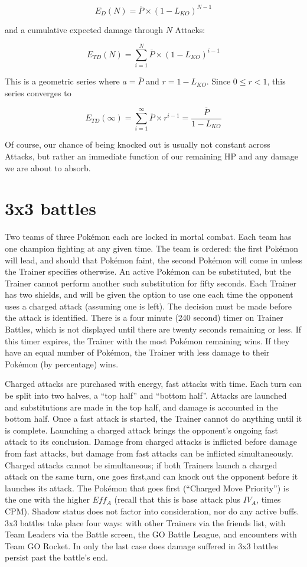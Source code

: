 \[ E_D(N) = \overline{P} \times (1 - L_{KO})^{N-1} \]

and a cumulative expected damage through $N$ Attacks:

\[ E_{TD}(N) = \sum^N_{i=1} \overline{P} \times (1 - L_{KO})^{i-1} \]

This is a geometric series where $a = \overline{P}$ and $r = 1 - L_{KO}$.
Since $0 \leq r < 1$, this series converges to

\[ E_{TD}(\infty) = \sum^\infty_{i=1} \overline{P} \times r^{i-1} = \frac{\overline{P}}{1 - L_{KO}} \]

Of course, our chance of being knocked out is usually not constant across
 Attacks, but rather an immediate function of our remaining HP and any
 damage we are about to absorb.

\section{3x3 battles\label{sec:3x3}}
Two teams of three Pokémon each are locked in mortal combat.
Each team has one champion fighting at any given time.
The team is ordered: the first Pokémon will lead, and should that Pokémon
  faint, the second Pokémon will come in unless the Trainer specifies otherwise.
An active Pokémon can be substituted, but the Trainer cannot perform another
  such substitution for fifty seconds.
Each Trainer has two shields, and will be given the option to use one each time
  the opponent uses a charged attack (assuming one is left).
The decision must be made before the attack is identified.
There is a four minute (240 second) timer on Trainer Battles, which is not displayed
  until there are twenty seconds remaining or less.
If this timer expires, the Trainer with the most Pokémon remaining wins.
If they have an equal number of Pokémon, the Trainer with less damage to their
  Pokémon (by percentage) wins.

Charged attacks are purchased with energy, fast attacks with time.
Each turn can be split into two halves, a ``top half'' and ``bottom half''.
Attacks are launched and substitutions are made in the top half, and damage is accounted in the bottom half.
Once a fast attack is started, the Trainer cannot do anything until it is complete.
Launching a charged attack brings the opponent's ongoing fast attack to its conclusion.
Damage from charged attacks is inflicted before damage from fast attacks,
  but damage from fast attacks can be inflicted simultaneously.
Charged attacks cannot be simultaneous; if both Trainers launch a charged attack
  on the same turn, one goes first,and can knock out the opponent before it
  launches its attack.
The Pokémon that goes first (``Charged Move Priority'') is the one with the
  higher $Eff_A$ (recall that this is base attack plus $IV_A$, times CPM).
Shadow status does not factor into consideration, nor do any active buffs.
3x3 battles take place four ways: with other Trainers via the friends list,
 with Team Leaders via the Battle screen, the GO Battle League,
 and encounters with Team GO Rocket.
In only the last case does damage suffered in 3x3 battles persist past the battle's end.

